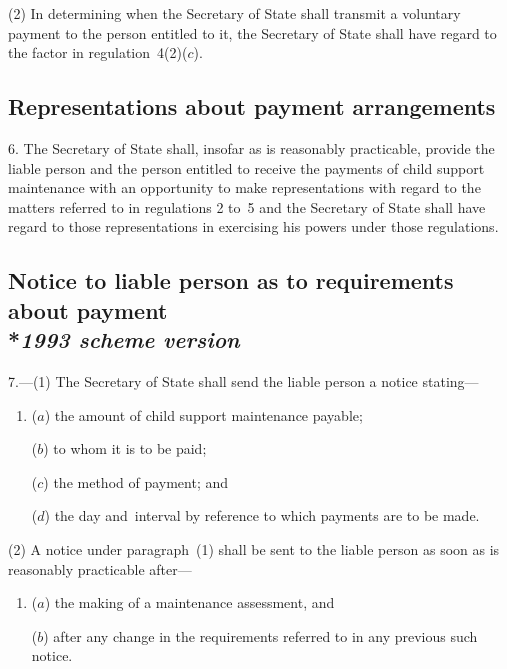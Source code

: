 \documentclass[12pt,a4paper]{article}
\begin{document}
(2) In determining when the Secretary of State shall transmit a voluntary payment to the person entitled to it, the Secretary of State shall have regard to the factor in regulation~4(2)($c$).


\subsection[6. Representations about payment arrangements]{Representations about payment arrangements}

6.  The Secretary of State shall, insofar as is reasonably practicable, provide the liable person and the person entitled to receive the payments of child support maintenance with an opportunity to make representations with regard to the matters referred to in regulations 2 to~5 and the Secretary of State shall have regard to those representations in exercising his powers under those regulations.

\subsection[7. Notice to liable person as to requirements about payment --- \emph{1993 scheme version}]{Notice to liable person as to requirements about payment\\*\emph{1993 scheme version}}

7.—(1) The Secretary of State shall send the liable person a notice stating—
\begin{enumerate}\item[]
($a$) the amount of child support maintenance payable;

($b$) to whom it is to be paid;

($c$) the method of payment; and

($d$) the day and~interval by reference to which payments are to be made.
\end{enumerate}

(2) A notice under paragraph~(1) shall be sent to the liable person as soon as is reasonably practicable after—
\begin{enumerate}\item[]
($a$) the making of a maintenance assessment, and

($b$) after any change in the requirements referred to in any previous such notice.
\end{enumerate}
\end{document}

